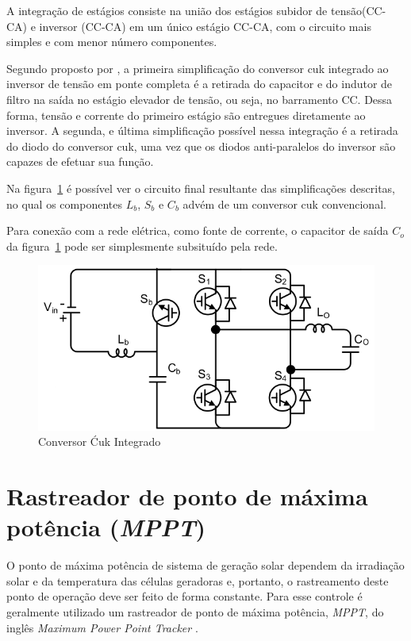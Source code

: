 \documentclass[
	12pt,				%
	openright,			%
	onseside,
	a4paper,			%
	english,			%
	french,				%
	spanish,			%
	brazil,				%
	]{abntex2}
\begin{document}
A integração de estágios consiste na união dos estágios subidor de tensão(CC-CA) e inversor (CC-CA) em um único estágio CC-CA, com o circuito mais simples e com menor número componentes. 

Segundo proposto por , a primeira simplificação do conversor cuk integrado ao inversor de tensão em ponte completa é a retirada do capacitor e do indutor de filtro na saída no estágio elevador de tensão, ou seja, no barramento CC. Dessa forma, tensão e corrente do primeiro estágio são entregues diretamente ao inversor. A segunda, e última simplificação possível nessa integração é a retirada do diodo do conversor cuk, uma vez que os diodos anti-paralelos do inversor são capazes de efetuar sua função.

Na figura~\ref{fig:integ_cuk_circ} é possível ver o circuito final resultante das simplificações descritas, no qual os componentes $L_b$, $S_b$ e $C_b$ advém de um conversor cuk convencional. 

Para conexão com a rede elétrica, como fonte de corrente, o capacitor de saída $C_o$ da figura~\ref{fig:integ_cuk_circ} pode ser simplesmente subsituído pela rede\cite{LUIGI_int_top}. 

\begin{figure}[]
	\begin{center}
		\includegraphics[width=0.55 \linewidth]{integ_cuk_circ}
		\caption{Conversor Ćuk Integrado \cite{LUIGI_int_top}}
		\label{fig:integ_cuk_circ}
	\end{center}
\end{figure}

\section{Rastreador de ponto de máxima potência (\textit{MPPT})}

O ponto de máxima potência de sistema de geração solar dependem da irradiação solar e da temperatura das células geradoras e, portanto, o rastreamento deste ponto de operação deve ser feito de forma constante. Para esse controle é geralmente utilizado um rastreador de ponto de máxima potência, \emph{MPPT}, do inglês \textit{Maximum Power Point Tracker} \cite{Talha_MPPT}. 
\end{document}
